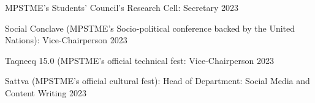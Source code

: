 \vspace{-3mm} 

\begin{cventries}
	
\cventry
	{} %
	{MPSTME's Students' Council's Research Cell: Secretary} %
	{2023}%
	{} %
	{}
\vspace{-8.5mm} 

 \cventry
	{} %
	{Social Conclave (MPSTME's Socio-political conference backed by the United Nations): Vice-Chairperson} %
	{2023}%
	{} %
	{}
\vspace{-8.5mm} 

\vspace{1mm}
 \cventry
	{} %
	{Taqneeq 15.0 (MPSTME’s official technical fest: Vice-Chairperson} %
	{2023}%
	{} %
	{}
\vspace{-8.5mm} 

\vspace{1mm}
 \cventry
	{} %
	{Sattva (MPSTME’s official cultural fest): Head of Department: Social Media and Content Writing} %
	{2023}%
	{} %
	{}
\vspace{-8.5mm} 




\vspace{-6.0mm}  

 
\end{cventries}
